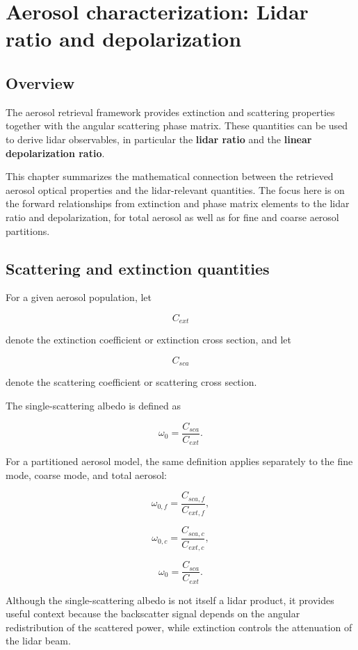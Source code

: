 \documentclass[
  letterpaper,
]{scrbook}
\begin{document}
\chapter{Aerosol characterization: Lidar ratio and
depolarization}\label{aerosol-characterization-lidar-ratio-and-depolarization}

\section{Overview}\label{overview-3}

The aerosol retrieval framework provides extinction and scattering
properties together with the angular scattering phase matrix. These
quantities can be used to derive lidar observables, in particular the
\textbf{lidar ratio} and the \textbf{linear depolarization ratio}.

This chapter summarizes the mathematical connection between the
retrieved aerosol optical properties and the lidar-relevant quantities.
The focus here is on the forward relationships from extinction and phase
matrix elements to the lidar ratio and depolarization, for total aerosol
as well as for fine and coarse aerosol partitions.

\section{Scattering and extinction
quantities}\label{scattering-and-extinction-quantities}

For a given aerosol population, let

\[
C_{ext}
\]

denote the extinction coefficient or extinction cross section, and let

\[
C_{sca}
\]

denote the scattering coefficient or scattering cross section.

The single-scattering albedo is defined as

\[
\omega_0 = \frac{C_{sca}}{C_{ext}}.
\]

For a partitioned aerosol model, the same definition applies separately
to the fine mode, coarse mode, and total aerosol:

\[
\omega_{0,f} = \frac{C_{sca,f}}{C_{ext,f}},
\]

\[
\omega_{0,c} = \frac{C_{sca,c}}{C_{ext,c}},
\]

\[
\omega_{0} = \frac{C_{sca}}{C_{ext}}.
\]

Although the single-scattering albedo is not itself a lidar product, it
provides useful context because the backscatter signal depends on the
angular redistribution of the scattered power, while extinction controls
the attenuation of the lidar beam.
\end{document}
